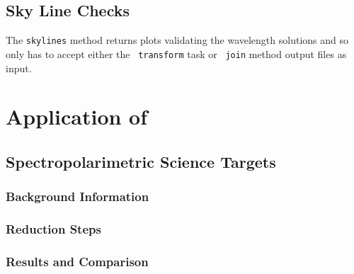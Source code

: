 
\subsection{Sky Line Checks} \label{subsec:test_sky}

The \texttt{skylines} method returns plots validating the wavelength solutions and so only has to accept either the \iraf\ \texttt{transform} task or \stops\ \texttt{join} method output files as input.



\section[Application of \textsc{stops}]{Application of \stops} \label{sec:results_unpub}

\subsection{Spectropolarimetric Science Targets}


\subsubsection{Background Information}


\subsubsection{Reduction Steps}


\subsubsection{Results and Comparison}

